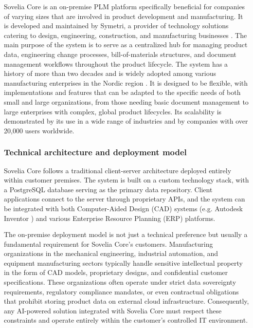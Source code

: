 Sovelia Core is an on-premise PLM platform specifically beneficial for companies of varying sizes that are involved in product development and manufacturing. It is developed and maintained by Symetri, a provider of technology solutions catering to design, engineering, construction, and manufacturing businesses \parencite{Symetri2025Company}. The main purpose of the system is to serve as a centralized hub for managing product data, engineering change processes, bill-of-materials structures, and document management workflows throughout the product lifecycle. The system has a history of more than two decades and is widely adopted among various manufacturing enterprises in the Nordic region \parencite{DigitalSolutionsEngineering}. It is designed to be flexible, with implementations and features that can be adapted to the specific needs of both small and large organizations, from those needing basic document management to large enterprises with complex, global product lifecycles. Its scalability is demonstrated by its use in a wide range of industries and by companies with over 20,000 users worldwide. \parencite{DigitalSolutionsEngineering}

\subsubsection{Technical architecture and deployment model}

Sovelia Core follows a traditional client-server architecture \parencite{saternosClientServerWebApps2014} deployed entirely within customer premises. The system is built on a custom technology stack, with a PostgreSQL database serving as the primary data repository. Client applications connect to the server through proprietary APIs, and the system can be integrated with both Computer-Aided Design (CAD) systems (e.g. Autodesk Inventor \parencite{autodeskAutodeskInventorSoftware}) and various Enterprise Resource Planning (ERP) platforms.

The on-premise deployment model is not just a technical preference but usually a fundamental requirement for Sovelia Core's customers. Manufacturing organizations in the mechanical engineering, industrial automation, and equipment manufacturing sectors typically handle sensitive intellectual property in the form of CAD models, proprietary designs, and confidential customer specifications. These organizations often operate under strict data sovereignty requirements, regulatory compliance mandates, or even contractual obligations that prohibit storing product data on external cloud infrastructure. Consequently, any AI-powered solution integrated with Sovelia Core must respect these constraints and operate entirely within the customer's controlled IT environment.

